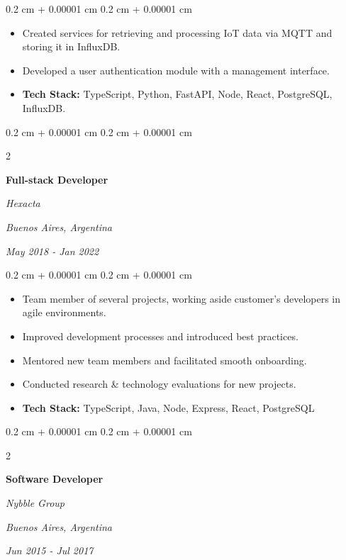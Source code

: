 \documentclass[10pt, letterpaper]{article}
\newenvironment{highlights}{
    \begin{itemize}[
        topsep=0.10 cm,
        parsep=0.10 cm,
        partopsep=0pt,
        itemsep=0pt,
        leftmargin=0.4 cm + 10pt
    ]
}{
    \end{itemize}
} %
\newenvironment{onecolentry}{
    \begin{adjustwidth}{
        0.2 cm + 0.00001 cm
    }{
        0.2 cm + 0.00001 cm
    }
}{
    \end{adjustwidth}
} %
\newenvironment{twocolentry}[2][]{
    \onecolentry
    \def\secondColumn{#2}
    \setcolumnwidth{\fill, 4.5 cm}
    \begin{paracol}{2}
}{
    \switchcolumn \raggedleft \secondColumn
    \end{paracol}
    \endonecolentry
} %
\begin{document}
        \vspace{0.10 cm}
        \begin{onecolentry}
            \begin{highlights}
                \item Created services for retrieving and processing IoT data via MQTT and storing it in InfluxDB.
                \item Developed a user authentication module with a management interface.
                \item \textbf{Tech Stack:} TypeScript, Python, FastAPI, Node, React, PostgreSQL, InfluxDB.
            \end{highlights}
        \end{onecolentry}


        \vspace{0.2 cm}

        \begin{twocolentry}{
        \textit{Buenos Aires, Argentina}    
            
        \textit{May 2018 - Jan 2022}}
            \textbf{Full-stack Developer}
            
            \textit{Hexacta}
        \end{twocolentry}

        \vspace{0.10 cm}
        \begin{onecolentry}
            \begin{highlights}
                \item Team member of several projects, working aside customer's developers in agile environments.
                \item Improved development processes and introduced best practices.
                \item Mentored new team members and facilitated smooth onboarding.
                \item Conducted research \& technology evaluations for new projects.
                \item \textbf{Tech Stack:} TypeScript, Java, Node, Express, React, PostgreSQL
            \end{highlights}
        \end{onecolentry}


        \vspace{0.2 cm}

        \begin{twocolentry}{
        \textit{Buenos Aires, Argentina}    
            
        \textit{Jun 2015 - Jul 2017}}
            \textbf{Software Developer}
            
            \textit{Nybble Group}
        \end{twocolentry}
\end{document}
